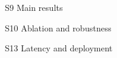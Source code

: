 \begin{frame}{S9 Main results}
\end{frame}

\begin{frame}{S10 Ablation and robustness}
\end{frame}

\begin{frame}{S13 Latency and deployment}
\end{frame}


